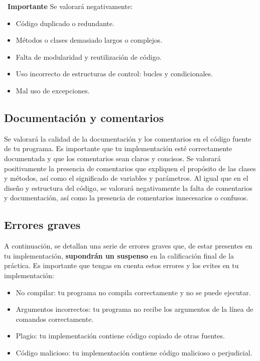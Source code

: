 \documentclass[
    a4paper, %
    12pt, %
]{CSSullivanBusinessReport}
\begin{document}
\begin{twothirdswidth}
\faExclamation~\textbf{Importante} Se valorará negativamente:
\begin{itemize}
	\item Código duplicado o redundante.
	\item Métodos o clases demasiado largos o complejos.
	\item Falta de modularidad y reutilización de código.
	\item Uso incorrecto de estructuras de control: bucles y condicionales.
	\item Mal uso de excepciones.
\end{itemize}
\subsection{Documentación y comentarios}\label{sec:criterios-documentacion}
Se valorará la calidad de la documentación y los comentarios en el código fuente de tu programa. Es importante que tu implementación esté correctamente documentada y que los comentarios sean claros y concisos. Se valorará positivamente la presencia de comentarios que expliquen el propósito de las clases y métodos, así como el significado de variables y parámetros. Al igual que en el diseño y estructura del código, se valorará negativamente la falta de comentarios y documentación, así como la presencia de comentarios innecesarios o confusos.
\subsection{Errores graves}\label{sec:criterios-errores}
A continuación, se detallan una serie de errores graves que, de estar presentes en tu implementación, \textbf{supondrán un suspenso} en la calificación final de la práctica. Es importante que tengas en cuenta estos errores y los evites en tu implementación:
\begin{itemize}
	\item No compilar: tu programa no compila correctamente y no se puede ejecutar.
	\item Argumentos incorrectos: tu programa no recibe los argumentos de la línea de comandos correctamente.
	\item Plagio: tu implementación contiene código copiado de otras fuentes.
	\item Código malicioso: tu implementación contiene código malicioso o perjudicial.
\end{itemize}
\end{twothirdswidth}
\end{document}
